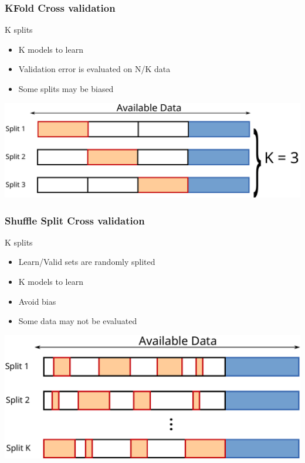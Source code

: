 \documentclass[11pt, pdf, compress, handout]{beamer}
\begin{document}
\begin{frame}
  \frametitle{KFold Cross validation}
  
    \begin{block}{K splits}
      \begin{itemize}
      \item[\itemplus] K models to learn
      \item Validation error is evaluated on N/K data
      \item Some splits may be biased
      \end{itemize}
      \begin{center}
        \includegraphics[width=\textwidth]{datasplit-kfold}
    \end{center}
  \end{block}
\end{frame}

\begin{frame}
  \frametitle{Shuffle Split Cross validation}
      \begin{block}{K splits}
      \begin{itemize}
      \item Learn/Valid sets are randomly splited 
      \item[\itemplus] K models to learn
      \item[\itemplus] Avoid bias
      \item [\itemmoins] Some data may not be evaluated
      \end{itemize}
      \begin{center}
        \includegraphics[width=\textwidth]{datasplit-shufflesplit}
    \end{center}
  \end{block}

\end{frame}
\end{document}
